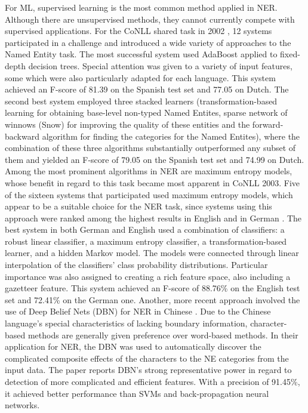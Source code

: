 \documentclass[11pt]{article}
\begin{document}
For ML, supervised learning is the most common method applied in NER.
Although there are unsupervised methods, they cannot currently compete with supervised applications.
For the CoNLL shared task in 2002 \cite{tksintro}, 12 systems participated in a challenge and introduced a wide variety of approaches to the Named Entity task.
The most successful system used AdaBoost applied to fixed-depth decision trees. Special attention was given to a variety of input features, some which were also
particularly adapted for each language. This system achieved an F-score of 81.39 on the Spanish test set and 77.05 on Dutch.
The second best system \cite{Florian:2002:NER:1118853.1118863} employed three stacked
learners (transformation-based learning for obtaining base-level non-typed Named Entites, sparse network of winnows (Snow) for improving the quality of these entities 
and the forward-backward algorithm for finding the categories for the Named Entites), where the combination of these three algorithms substantially outperformed 
any subset of them and yielded an F-score of 79.05 on the Spanish test set and 74.99 on Dutch.
Among the most prominent algorithms in NER are maximum entropy models, whose benefit in regard to this task became most apparent in CoNLL 2003. 
Five of the sixteen systems that participated used maximum entropy models, which appear to be a suitable choice for the NER task, 
since systems using this approach were ranked among the highest results in English and in German \cite{TjongKimSang:2003:ICS:1119176.1119195}.
The best system in both German and English \cite{Florian:2003:NER:1119176.1119201} used a combination of classifiers: a robust linear classifier, 
a maximum entropy classifier, a transformation-based learner, and a hidden Markov model. The models were connected through linear interpolation 
of the classifiers’ %
class probability distributions. Particular importance was also assigned to creating a rich feature space, also including a gazetteer feature. 
This system achieved an F-score of 88.76\% on the English test set and 72.41\% on the German one.
Another, more recent approach involved the use of Deep Belief Nets (DBN) for NER in Chinese \cite{Chen:2010:UDB:1870457.1870473}.
Due to the Chinese language's special characteristics of lacking boundary information, character-based methods are generally given preference over word-based methods.
In their application for NER, the DBN  was used to automatically discover the complicated composite effects of the characters to the NE categories from the input data. 
The paper reports DBN's strong representative power in regard to detection of more complicated and efficient features. With a precision of 91.45\%,
it achieved better performance than SVMs and back-propagation neural networks.
\end{document}
